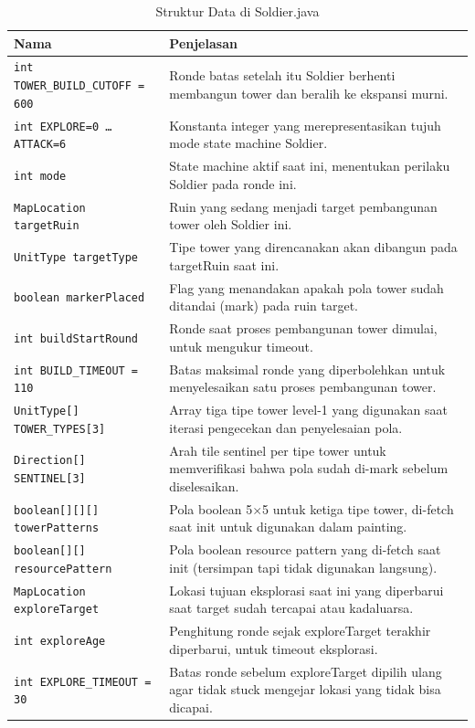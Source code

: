 \documentclass{article}
\begin{document}
\begin{enumerate}[label=\alph*.]
\begin{longtable}{|p{}|p{}|}
\caption{Struktur Data di Soldier.java} \\
\hline
\textbf{Nama} & \textbf{Penjelasan} \\
\hline
\endhead
\hline
\endfoot
\texttt{int TOWER\_BUILD\_CUTOFF = 600} & Ronde batas setelah itu Soldier berhenti membangun tower dan beralih ke ekspansi murni. \\
\hline
\texttt{int EXPLORE=0 \ldots ATTACK=6} & Konstanta integer yang merepresentasikan tujuh mode state machine Soldier. \\
\hline
\texttt{int mode} & State machine aktif saat ini, menentukan perilaku Soldier pada ronde ini. \\
\hline
\texttt{MapLocation targetRuin} & Ruin yang sedang menjadi target pembangunan tower oleh Soldier ini. \\
\hline
\texttt{UnitType targetType} & Tipe tower yang direncanakan akan dibangun pada targetRuin saat ini. \\
\hline
\texttt{boolean markerPlaced} & Flag yang menandakan apakah pola tower sudah ditandai (mark) pada ruin target. \\
\hline
\texttt{int buildStartRound} & Ronde saat proses pembangunan tower dimulai, untuk mengukur timeout. \\
\hline
\texttt{int BUILD\_TIMEOUT = 110} & Batas maksimal ronde yang diperbolehkan untuk menyelesaikan satu proses pembangunan tower. \\
\hline
\texttt{UnitType[] TOWER\_TYPES[3]} & Array tiga tipe tower level-1 yang digunakan saat iterasi pengecekan dan penyelesaian pola. \\
\hline
\texttt{Direction[] SENTINEL[3]} & Arah tile sentinel per tipe tower untuk memverifikasi bahwa pola sudah di-mark sebelum diselesaikan. \\
\hline
\texttt{boolean[][][] towerPatterns} & Pola boolean 5\(\times\)5 untuk ketiga tipe tower, di-fetch saat init untuk digunakan dalam painting. \\
\hline
\texttt{boolean[][] resourcePattern} & Pola boolean resource pattern yang di-fetch saat init (tersimpan tapi tidak digunakan langsung). \\
\hline
\texttt{MapLocation exploreTarget} & Lokasi tujuan eksplorasi saat ini yang diperbarui saat target sudah tercapai atau kadaluarsa. \\
\hline
\texttt{int exploreAge} & Penghitung ronde sejak exploreTarget terakhir diperbarui, untuk timeout eksplorasi. \\
\hline
\texttt{int EXPLORE\_TIMEOUT = 30} & Batas ronde sebelum exploreTarget dipilih ulang agar tidak stuck mengejar lokasi yang tidak bisa dicapai. \\
\hline
\end{longtable}


\end{enumerate}
\end{document}
